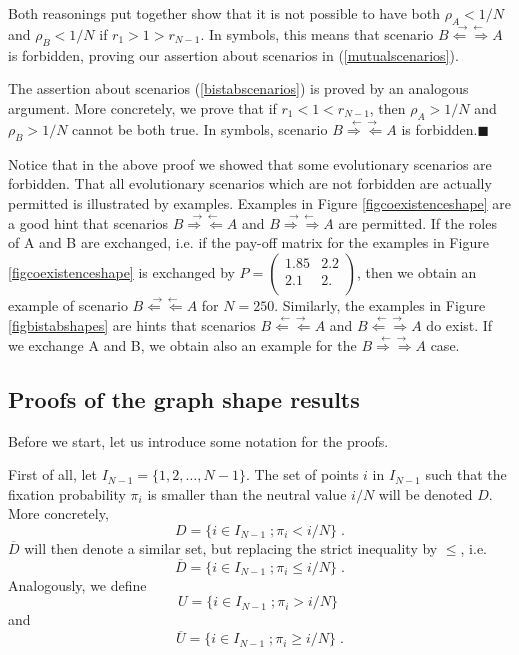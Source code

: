 \documentclass[12pt]{article}
\begin{document}
Both reasonings put together show that it is not possible to have both $ \rho_A<1/N $ and $ \rho_B<1/N $ if  $ r_1> 1> r_{N-1} $. In symbols, this means that scenario $B\stackrel{\rightarrow \leftarrow}{\Leftarrow \Rightarrow} A$ is forbidden, proving our assertion about scenarios in (\ref{mutualscenarios}).

The assertion about scenarios (\ref{bistabscenarios}) is proved by an analogous argument. More concretely, we prove that if $ r_1 < 1 < r_{N-1} $, then $ \rho_A>1/N $ and $ \rho_B>1/N $ cannot be both true. In symbols, scenario $B\stackrel{\leftarrow \rightarrow}{\Rightarrow \Leftarrow} A$ is forbidden.$\blacksquare$

Notice that in the above proof we showed that some evolutionary scenarios are forbidden. That all evolutionary scenarios which are not forbidden are actually permitted is illustrated by examples. Examples in Figure \ref{figcoexistenceshape} are a good hint that scenarios $B\stackrel{\rightarrow \leftarrow}{\Rightarrow \Leftarrow} A$ and $B\stackrel{\rightarrow \leftarrow}{\Rightarrow \Rightarrow} A$ are permitted. If the roles of A and B are exchanged, i.e. if the pay-off matrix for the examples in Figure \ref{figcoexistenceshape} is exchanged by $P=\left(
\begin{array}{cc}
1.85 & 2.2 \\
2.1 & 2. \\
\end{array}
\right)$, then we obtain an example of scenario $B\stackrel{\rightarrow \leftarrow}{\Leftarrow \Leftarrow} A$ for $N=250$. Similarly, the examples in Figure \ref{figbistabshapes} are hints that scenarios $B\stackrel{\leftarrow \rightarrow}{\Leftarrow \Leftarrow} A$ and  $B\stackrel{\leftarrow \rightarrow}{\Leftarrow \Rightarrow} A$ do exist. If we exchange A and B, we obtain also an example for the $B\stackrel{\leftarrow \rightarrow}{\Rightarrow \Rightarrow} A$ case.

\subsection{Proofs of the graph shape results}
Before we start, let us introduce some notation for the proofs.

First of all, let $I_{N-1} = \{1,2, \dots, N-1\}$. The set of points $i$ in $I_{N-1}$ such that the fixation probability $\pi_i$ is smaller than the neutral value $i/N$ will be denoted $D$. More concretely,
\[D = \{i \in I_{N-1} \;; \pi_i<i/N\} \;.\]
$\overline{D}$ will then denote a similar set, but replacing the strict inequality by $\leq$, i.e.
\[\overline{D} = \{i \in I_{N-1} \;; \pi_i\leq i/N\} \;.\]
Analogously, we define 
\[U = \{i \in I_{N-1} \;; \pi_i>i/N\} \;\]
and
\[\overline{U} = \{i \in I_{N-1} \;; \pi_i\geq i/N\} \;.\]
\end{document}
